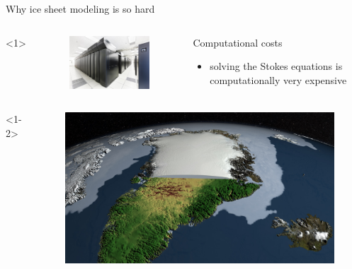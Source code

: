 \documentclass[hide notes,intlimits]{beamer}
\begin{document}
\begin{frame}{Why ice sheet modeling is so hard}
    \begin{columns}[c]<1>
      \begin{column}{.3\linewidth}
        \begin{figure}
          \includegraphics[width=\linewidth]{bw_front_sm}
        \end{figure}
      \end{column}
      \begin{column}{.67\linewidth}
        \begin{block}{Computational costs}
        \begin{itemize}
        \item solving the Stokes equations is computationally very expensive
        \end{itemize}
      \end{block}
      \end{column}
    \end{columns}
    \begin{columns}[c]<1-2>
      \begin{column}{.28\linewidth}
        \begin{figure}
          \includegraphics[width=\linewidth]{canale_grande_V05}

\end{figure}
\end{column}
\end{columns}
\end{frame}
\end{document}
